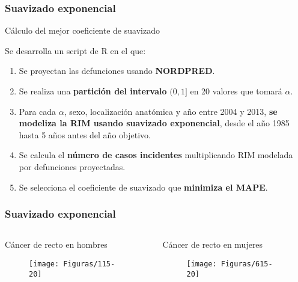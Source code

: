 \documentclass{beamer}
\begin{document}

\begin{frame}\frametitle{Suavizado exponencial}
	
	\small
	\begin{block}{Cálculo del mejor coeficiente de suavizado}
		
		Se desarrolla un script de R en el que:
		\begin{enumerate}
			\item Se proyectan las defunciones usando \textbf{NORDPRED}.
			\item Se realiza una \textbf{partición del intervalo} $(0, 1]$ en 20 valores que tomará $\alpha$.\\[2ex] %
			\item Para cada $\alpha$, sexo, localización anatómica y año entre 2004 y 2013, \textbf{se modeliza la RIM usando suavizado exponencial}, desde el año 1985 hasta 5 años antes del año objetivo.
			\item Se calcula el \textbf{número de casos incidentes} multiplicando RIM modelada por defunciones proyectadas.\\
			\item Se selecciona el coeficiente de suavizado que \textbf{minimiza el MAPE}.
		\end{enumerate}

	\end{block}

\end{frame}


\begin{frame}\frametitle{Suavizado exponencial}
	\begin{columns}
		\begin{column}{0.5\textwidth}
		\centering	Cáncer de recto en hombres
			\begin{figure}
				\centering
				\texttt{[image: Figuras/115-20]}
			\end{figure}
		\end{column}
		\begin{column}{0.5\textwidth}
		\centering	Cáncer de recto en mujeres
		\begin{figure}
			\centering
			\texttt{[image: Figuras/615-20]}
		\end{figure}
	\end{column}
	\end{columns}


\end{frame}
\end{document}
